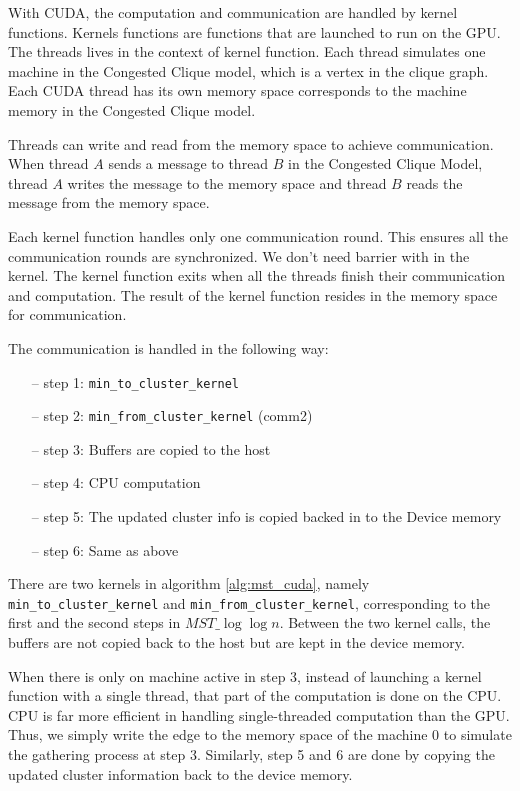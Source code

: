 \documentclass[english, 12pt, a4paper, elec, utf8, a-2b, online]{aaltothesis}
\newcommand{\mstalgo}{$MST\_\log\log{n}$}
\begin{document}
With CUDA, the computation and communication are handled by kernel functions. Kernels functions are functions that are launched to run on the GPU. The threads lives in the context of kernel function. Each  thread simulates one machine in the Congested Clique model, which is a vertex in the clique graph. Each CUDA thread has its own memory space corresponds to the machine memory in the Congested Clique model.

Threads can write and read from the memory space to achieve communication. When thread $A$ sends a message to thread $B$ in the Congested Clique Model, thread $A$ writes the message to the memory space and thread $B$ reads the message from the memory space.

Each kernel function handles only one communication round. This ensures all the communication rounds are synchronized. We don't need barrier with in the kernel. The kernel function exits when all the threads finish their communication and computation. The result of the kernel function resides in the memory space for communication.

The communication is handled in the following way:
\begin{itemize}
	\item[--] step 1: \texttt{min\_to\_cluster\_kernel}
	\item[--] step 2: \texttt{min\_from\_cluster\_kernel} (comm2)
	\item[--] step 3: Buffers are copied to the host
	\item[--] step 4: CPU computation
	\item[--] step 5: The updated cluster info is copied backed in to the Device memory
	\item[--] step 6: Same as above\
\end{itemize}

There are two kernels in algorithm \cref{alg:mst_cuda}, 
namely \texttt{min\_to\_cluster\_kernel} and \texttt{min\_from\_cluster\_kernel}, corresponding to the first and the second steps in \mstalgo{}. Between the two kernel calls, the buffers are not copied back to the host but are kept in the device memory.

When there is only on machine active in step 3, instead of launching a kernel function with a single thread, that part of the computation is done on the CPU. CPU is far more efficient in handling single-threaded computation than the GPU. Thus, we simply write the edge to the memory space of the machine 0 to simulate the gathering process at step 3. Similarly, step 5 and 6 are done by copying the updated cluster information back to the device memory.
\end{document}
